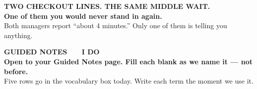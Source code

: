 \documentclass[aspectratio=169, 11pt]{beamer}
\begin{document}
{
\begin{frame}[plain]
  \vspace{1.5cm}
  \begin{center}
    {\color{skymid}\bfseries\small TWO CHECKOUT LINES. THE SAME MIDDLE WAIT.}\\[0.9cm]
    {\color{white}\bfseries\Large One of them you would never stand in again.}\\[0.9cm]
    {\color{goldacc}\small Both managers report ``about 4 minutes.'' Only one of them is
    telling you anything.}
  \end{center}
\end{frame}
}

{
\begin{frame}[plain]
  \vspace{1.8cm}\hspace{0.8cm}%
  \begin{minipage}{0.86\textwidth}
    {\color{goldacc}\bfseries\small GUIDED NOTES \ \textbullet\ \ I DO}\\[0.7cm]
    {\color{white}\bfseries\Large Open to your Guided Notes page. Fill each blank as we
    name it --- not before.}\\[0.9cm]
    {\color{skymid}\small Five rows go in the vocabulary box today. Write each term the
    moment we use it.}
  \end{minipage}
\end{frame}
}
\end{document}
